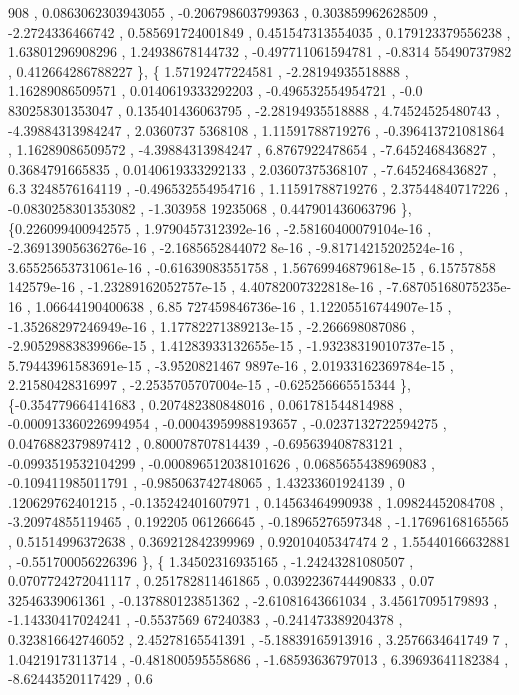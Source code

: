 \begin{DoxyCode}
      908 , 0.0863062303943055 , -0.206798603799363 , 0.303859962628509 ,  -2.2724336466742 , 0.585691724001849 , 
      0.451547313554035 , 0.179123379556238 ,  1.63801296908296 ,  1.24938678144732 , -0.497711061594781 , -0.8314
      55490737982 , 0.412664286788227 \},
\{ 1.57192477224581 , -2.28194935518888 ,  1.16289086509571 , 0.0140619333292203 , -0.496532554954721 , -0.0
      830258301353047 , 0.135401436063795 , -2.28194935518888 ,  4.74524525480743 , -4.39884313984247 ,  2.0360737
      5368108 ,  1.11591788719276 , -0.396413721081864 ,  1.16289086509572 , -4.39884313984247 ,   6.8767922478654
       ,  -7.6452468436827 ,   0.3684791665835 , 0.0140619333292133 ,  2.03607375368107 ,  -7.6452468436827 ,  6.3
      3248576164119 , -0.496532554954716 ,  1.11591788719276 ,  2.37544840717226 , -0.0830258301353082 , -1.303958
      19235068 , 0.447901436063796 \},
\{0.226099400942575 , 1.9790457312392e-16 , -2.58160400079104e-16 , -2.36913905636276e-16 , -2.1685652844072
      8e-16 , -9.81714215202524e-16 , 3.65525653731061e-16 , -0.61639083551758 , 1.56769946879618e-15 , 6.15757858
      142579e-16 , -1.23289162052757e-15 , 4.40782007322818e-16 , -7.68705168075235e-16 ,  1.06644190400638 , 6.85
      727459846736e-16 , 1.12205516744907e-15 , -1.35268297246949e-16 , 1.17782271389213e-15 ,   -2.266698087086 ,
       -2.90529883839966e-15 , 1.41283933132655e-15 , -1.93238319010737e-15 , 5.79443961583691e-15 , -3.9520821467
      9897e-16 , 2.01933162369784e-15 ,  2.21580428316997 , -2.2535705707004e-15 , -0.625256665515344 \},
\{-0.354779664141683 , 0.207482380848016 , 0.061781544814988 , -0.000913360226994954 , -0.00043959988193657 
      , -0.0237132722594275 , 0.0476882379897412 , 0.800078707814439 , -0.695639408783121 , -0.0993519532104299 , 
      -0.000896512038101626 , 0.0685655438969083 , -0.109411985011791 , -0.985063742748065 ,  1.43233601924139 , 0
      .120629762401215 , -0.135242401607971 ,  0.14563464990938 ,  1.09824452084708 , -3.20974855119465 , 0.192205
      061266645 , -0.18965276597348 , -1.17696168165565 ,  0.51514996372638 , 0.369212842399969 , 0.92010405347474
      2 ,  1.55440166632881 , -0.551700056226396 \},
\{ 1.34502316935165 , -1.24243281080507 , 0.0707724272041117 , 0.251782811461865 , 0.0392236744490833 , 0.07
      32546339061361 , -0.137880123851362 , -2.61081643661034 ,  3.45617095179893 , -1.14330417024241 , -0.5537569
      67240383 , -0.241473389204378 , 0.323816642746052 ,  2.45278165541391 , -5.18839165913916 ,  3.2576634641749
      7 ,  1.04219173113714 , -0.481800595558686 , -1.68593636797013 ,  6.39693641182384 , -8.62443520117429 , 0.6

\end{DoxyCode}
